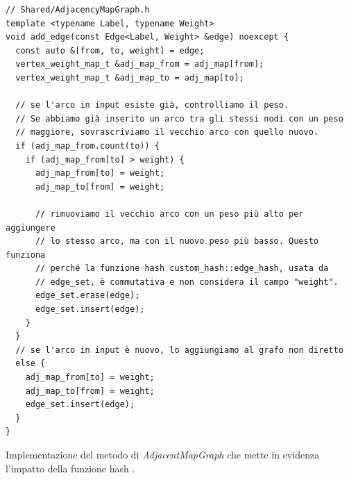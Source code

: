 \begin{listing}[!hb]
\begin{verbatim}
// Shared/AdjacencyMapGraph.h
template <typename Label, typename Weight>
void add_edge(const Edge<Label, Weight> &edge) noexcept {
  const auto &[from, to, weight] = edge;
  vertex_weight_map_t &adj_map_from = adj_map[from];
  vertex_weight_map_t &adj_map_to = adj_map[to];

  // se l'arco in input esiste già, controlliamo il peso.
  // Se abbiamo già inserito un arco tra gli stessi nodi con un peso
  // maggiore, sovrascriviamo il vecchio arco con quello nuovo.
  if (adj_map_from.count(to)) {
    if (adj_map_from[to] > weight) {
      adj_map_from[to] = weight;
      adj_map_to[from] = weight;

      // rimuoviamo il vecchio arco con un peso più alto per aggiungere
      // lo stesso arco, ma con il nuovo peso più basso. Questo funziona
      // perché la funzione hash custom_hash::edge_hash, usata da
      // edge_set, è commutativa e non considera il campo "weight".
      edge_set.erase(edge);
      edge_set.insert(edge);
    }
  }
  // se l'arco in input è nuovo, lo aggiungiamo al grafo non diretto
  else {
    adj_map_from[to] = weight;
    adj_map_to[from] = weight;
    edge_set.insert(edge);
  }
}
\end{verbatim}
\caption{Implementazione del metodo  di \textit{AdjacentMapGraph} che mette in evidenza l'impatto della funzione hash .}
\label{listing:add_edge}
\end{listing}


